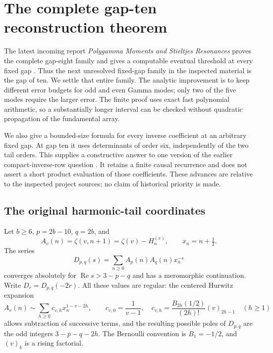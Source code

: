 \section{The complete gap-ten reconstruction theorem}
\label{gt:section}

The latest incoming report \emph{Polygamma Moments and Stieltjes
Resonances} proves the complete gap-eight family and gives a computable
eventual threshold at every fixed gap \cite{PolygammaResonances}.
Thus the next unresolved fixed-gap family in the inspected material is
the gap of ten. We settle that entire family. The analytic improvement
is to keep different error budgets for odd and even Gamma modes; only
two of the five modes require the larger error. The finite proof uses
exact fast polynomial arithmetic, so a substantially longer interval
can be checked without quadratic propagation of the fundamental array.

We also give a bounded-size formula for every inverse coefficient at
an arbitrary fixed gap. At gap ten it uses determinants of order six,
independently of the two tail orders. This supplies a constructive
answer to one version of the earlier compact-inverse-row question
\cite{BilinearTails}. It retains a finite causal recurrence and does
not assert a short product evaluation of those coefficients.
These advances are relative to the inspected project sources; no
claim of historical priority is made.

\subsection{The original harmonic-tail coordinates}

Let $b\ge6$, $p=2b-10$, $q=2b$, and
\[
 A_v(n)=\zeta(v,n+1)=\zeta(v)-H_n^{(v)},\qquad x_n=n+\tfrac12.
\]
The series
\[
 D_{p,q}(s)=\sum_{n\ge0} A_p(n)A_q(n)x_n^{-s}
\]
converges absolutely for $\operatorname{Re}s>3-p-q$ and has a
meromorphic continuation. Write $D_r=D_{p,q}(-2r)$.
All these values are regular: the centered Hurwitz expansion
\begin{equation}\label{gt:tail-expansion}
 A_v(n)\sim\sum_{h\ge0}c_{v,h}x_n^{1-v-2h},\qquad
 c_{v,0}=\frac1{v-1},\quad
 c_{v,h}=\frac{B_{2h}(1/2)}{(2h)!}(v)_{2h-1}\quad(h\ge1)
\end{equation}
allows subtraction of successive terms, and the resulting possible
poles of $D_{p,q}$ are the odd integers $3-p-q-2h$.
The Bernoulli convention is $B_1=-1/2$, and $(v)_k$ is a rising factorial.

